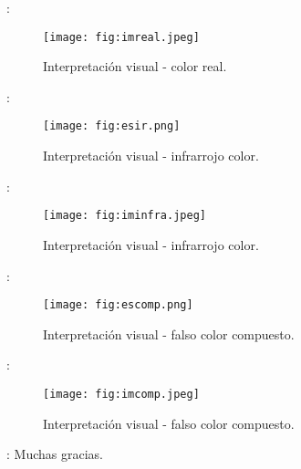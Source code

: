 \begin{frame}{\secname : \subsecname}
  \begin{figure}
    \centering
    \texttt{[image: fig:imreal.jpeg]}
    \caption{Interpretación visual - color real.}
    \label{}
  \end{figure}
\end{frame}

\begin{frame}{\secname : \subsecname}
  \begin{figure}
    \centering
    \texttt{[image: fig:esir.png]}
    \caption{Interpretación visual - infrarrojo color.}
    \label{}
  \end{figure}
\end{frame}

\begin{frame}{\secname : \subsecname}
  \begin{figure}
    \centering
    \texttt{[image: fig:iminfra.jpeg]}
    \caption{Interpretación visual - infrarrojo color.}
    \label{}
  \end{figure}
\end{frame}

\begin{frame}{\secname : \subsecname}
  \begin{figure}
    \centering
    \texttt{[image: fig:escomp.png]}
    \caption{Interpretación visual - falso color compuesto.}
    \label{}
  \end{figure}
\end{frame}

\begin{frame}{\secname : \subsecname}
  \begin{figure}
    \centering
    \texttt{[image: fig:imcomp.jpeg]}
    \caption{Interpretación visual - falso color compuesto.}
    \label{}
  \end{figure}
\end{frame}

\begin{frame}{\secname : \subsecname}
Muchas gracias.
\end{frame}

